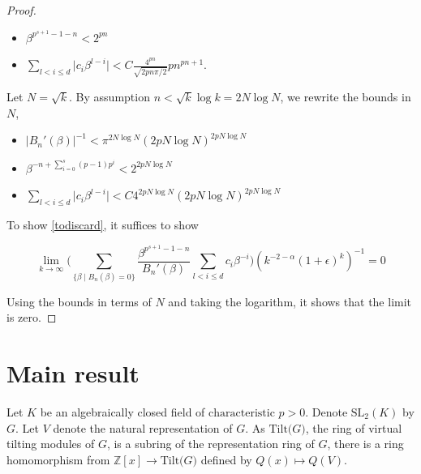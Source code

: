 \documentclass[11 pt]{amsart}
\theoremstyle{plain}
\theoremstyle{definition}
\theoremstyle{remark}
\def\Z{\mathbb{Z}}
\def\SL{\text{SL}}
\def\ch{\text{characteristic}}
\def\b{\beta}
\begin{document}
\begin{proof}
\begin{itemize}
        \item $\b^{{p^{s+1}-1-n}} < 2^{pn}$
        
        \item $\sum_{{l<i \le d}} \vert c_i \b^{l-i} \vert <  C \frac{4^{pn}}{\sqrt{2pn\pi/2}} pn^{pn+1}.$
    \end{itemize} 

    Let $N=\sqrt{k}$. By assumption $n < \sqrt{k}\log k=2N \log N$, we rewrite the bounds in $N$,

    \begin{itemize}
        \item $\vert B_n'(\b) \vert^{-1}< \pi ^{2N \log N}(2pN \log N)^{2pN\log N}$

        \item $\b^{-n+\sum_{i=0}^s(p-1)p^{i}}< 2^{2pN \log N} $

        \item  $\sum_{{l<i \le d}} \vert c_i \b^{l-i} \vert < C4^{2pN\log N}(2pN \log N)^{2p N \log N}$
    \end{itemize}

To show \eqref{todiscard}, it suffices to show 

$$\lim_{k \to \infty} \bigg(\sum_{\{\b \mid B_n(\b)=0\}} \frac{\b^{p^{s+1}-1-n}}{B_n'(\b)}\sum_{{l<i \le d}} c_i \b^{-i}\bigg) (k^{-2-\alpha}(1+\epsilon)^k)^{-1}=0$$

Using the bounds in terms of $N$ and taking the logarithm, it shows that the limit is zero.



\end{proof}

\section{Main result}

Let $K$ be an algebraically closed field of $\ch$ $p>0$. Denote $\SL_2(K)$ by $G$. Let $V$ denote the natural representation of $G$. As $\text{Tilt($G$)}$,  the ring of virtual tilting modules of $G$, is a subring of the representation ring of $G$, there is a ring homomorphism from $\Z[x] \to \text{Tilt($G$)}$ defined by $Q(x) \mapsto Q(V)$. 
\end{document}
